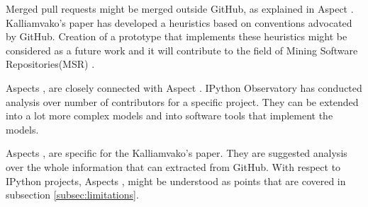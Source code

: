 Merged pull requests might be merged outside GitHub, as explained in Aspect . Kalliamvako's paper\cite{kalliamvakoupromises} has developed a heuristics based on conventions advocated by GitHub. Creation of a prototype that implements these heuristics might be considered as a future work and it will contribute to the field of Mining Software Repositories(MSR) \cite{MSR2016}.

\vspace{8mm}

Aspects ,  are closely connected with Aspect . IPython Observatory has conducted analysis over number of contributors for a specific project. They can be extended into a lot more complex models and into software tools that implement the models. 

Aspects ,  are specific for the Kalliamvako's paper\cite{kalliamvakoupromises}. They are suggested analysis over the whole information that can extracted from GitHub. With respect to IPython projects, Aspects ,  might be understood as points that are covered in subsection \ref{subsec:limitations}.




